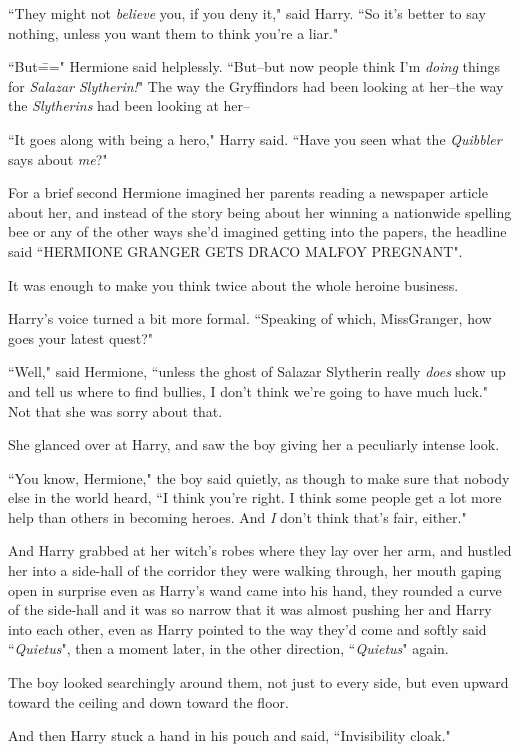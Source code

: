 ``They might not \emph{believe} you, if you deny it," said Harry. ``So it's better to say nothing, unless you want them to think you're a liar."

``But\===" Hermione said helplessly. ``But\---but now people think I'm \emph{doing} things for \emph{Salazar Slytherin!}" The way the Gryffindors had been looking at her\---the way the \emph{Slytherins} had been looking at her\---

``It goes along with being a hero," Harry said. ``Have you seen what the \emph{Quibbler} says about \emph{me}?"

For a brief second Hermione imagined her parents reading a newspaper article about her, and instead of the story being about her winning a nationwide spelling bee or any of the other ways she'd imagined getting into the papers, the headline said ``HERMIONE GRANGER GETS DRACO MALFOY PREGNANT".

It was enough to make you think twice about the whole heroine business.

Harry's voice turned a bit more formal. ``Speaking of which, Miss\?Granger, how goes your latest quest?"

``Well," said Hermione, ``unless the ghost of Salazar Slytherin really \emph{does} show up and tell us where to find bullies, I don't think we're going to have much luck." Not that she was sorry about that.

She glanced over at Harry, and saw the boy giving her a peculiarly intense look.

``You know, Hermione," the boy said quietly, as though to make sure that nobody else in the world heard, ``I think you're right. I think some people get a lot more help than others in becoming heroes. And \emph{I} don't think that's fair, either."

And Harry grabbed at her witch's robes where they lay over her arm, and hustled her into a side-hall of the corridor they were walking through, her mouth gaping open in surprise even as Harry's wand came into his hand, they rounded a curve of the side-hall and it was so narrow that it was almost pushing her and Harry into each other, even as Harry pointed to the way they'd come and softly said ``\emph{Quietus}", then a moment later, in the other direction, ``\emph{Quietus}" again.

The boy looked searchingly around them, not just to every side, but even upward toward the ceiling and down toward the floor.

And then Harry stuck a hand in his pouch and said, ``Invisibility cloak."

